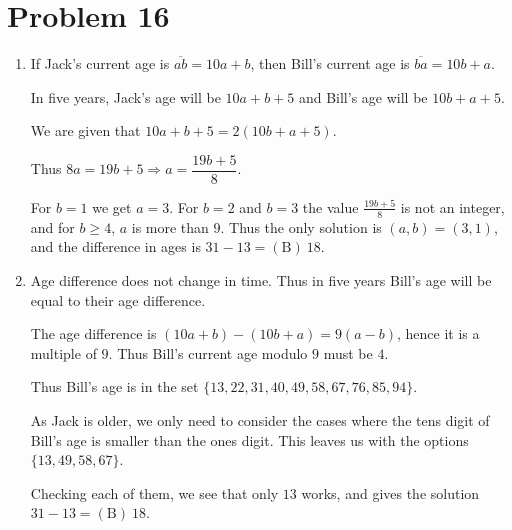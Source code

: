 \documentclass{article}%
\begin{document}
%
\section*{Problem 16}%
\label{sec:Problem16}%
\begin{enumerate}%
\item%
If Jack's current age is $\overline{ab}=10a+b$, then Bill's current age is $\overline{ba}=10b+a$.

In five years, Jack's age will be $10a+b+5$ and Bill's age will be $10b+a+5$. 

We are given that $10a+b+5=2(10b+a+5)$. 


Thus $8a=19b+5 \Rightarrow a=\dfrac{19b+5}{8}$. 

For $b=1$ we get $a=3$. For $b=2$ and $b=3$ the value $\frac{19b+5}8$ is not an integer, and for $b\geq 4$, $a$ is more than $9$. Thus the only solution is $(a,b)=(3,1)$, and the difference in ages is $31-13=\boxed{\mathrm{(B)\ }18}$.

%
\item%
Age difference does not change in time. Thus in five years Bill's age will be equal to their age difference.

The age difference is $(10a+b)-(10b+a)=9(a-b)$, hence it is a multiple of $9$. Thus Bill's current age modulo $9$ must be $4$.

Thus Bill's age is in the set $\{13,22,31,40,49,58,67,76,85,94\}$.

As Jack is older, we only need to consider the cases where the tens digit of Bill's age is smaller than the ones digit. This leaves us with the options $\{13,49,58,67\}$. 

Checking each of them, we see that only $13$ works, and gives the solution $31-13=\boxed{\mathrm{(B)\ }18}$.

%
\end{enumerate}

%
\end{document}
